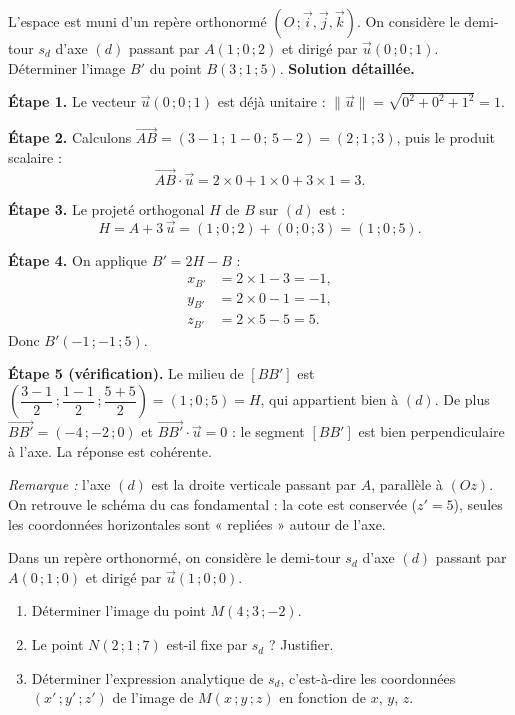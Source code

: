 \documentclass[11pt]{article}
\begin{document}
\begin{exoresolu}
L'espace est muni d'un repère orthonormé $(O\,;\vec{i},\vec{j},\vec{k})$. On considère le demi-tour $s_d$ d'axe $(d)$ passant par $A(1\,;0\,;2)$ et dirigé par $\vec{u}(0\,;0\,;1)$. Déterminer l'image $B'$ du point $B(3\,;1\,;5)$.
\tcblower
\textbf{Solution détaillée.}

\textbf{Étape 1.} Le vecteur $\vec{u}(0\,;0\,;1)$ est déjà unitaire : $\|\vec{u}\| = \sqrt{0^{2}+0^{2}+1^{2}} = 1$.

\textbf{Étape 2.} Calculons $\overrightarrow{AB} = (3-1\,;\,1-0\,;\,5-2) = (2\,;1\,;3)$, puis le produit scalaire :
\[
\overrightarrow{AB}\cdot\vec{u} = 2\times 0 + 1\times 0 + 3\times 1 = 3.
\]

\textbf{Étape 3.} Le projeté orthogonal $H$ de $B$ sur $(d)$ est :
\[
H = A + 3\,\vec{u} = (1\,;0\,;2) + (0\,;0\,;3) = (1\,;0\,;5).
\]

\textbf{Étape 4.} On applique $B' = 2H - B$ :
\begin{align*}
x_{B'} &= 2\times 1 - 3 = -1,\\
y_{B'} &= 2\times 0 - 1 = -1,\\
z_{B'} &= 2\times 5 - 5 = 5.
\end{align*}
Donc $\boxed{B'(-1\,;-1\,;5)}$.

\textbf{Étape 5 (vérification).} Le milieu de $[BB']$ est $\left(\dfrac{3-1}{2}\,;\dfrac{1-1}{2}\,;\dfrac{5+5}{2}\right) = (1\,;0\,;5) = H$, qui appartient bien à $(d)$. De plus $\overrightarrow{BB'} = (-4\,;-2\,;0)$ et $\overrightarrow{BB'}\cdot\vec{u} = 0$ : le segment $[BB']$ est bien perpendiculaire à l'axe. La réponse est cohérente.

\emph{Remarque :} l'axe $(d)$ est la droite verticale passant par $A$, parallèle à $(Oz)$. On retrouve le schéma du cas fondamental : la cote est conservée ($z' = 5$), seules les coordonnées horizontales sont « repliées » autour de l'axe.
\end{exoresolu}

\begin{exercice}
Dans un repère orthonormé, on considère le demi-tour $s_d$ d'axe $(d)$ passant par $A(0\,;1\,;0)$ et dirigé par $\vec{u}(1\,;0\,;0)$.
\begin{enumerate}
\item Déterminer l'image du point $M(4\,;3\,;-2)$.
\item Le point $N(2\,;1\,;7)$ est-il fixe par $s_d$ ? Justifier.
\item Déterminer l'expression analytique de $s_d$, c'est-à-dire les coordonnées $(x'\,;y'\,;z')$ de l'image de $M(x\,;y\,;z)$ en fonction de $x$, $y$, $z$.
\end{enumerate}
\end{exercice}
\end{document}
